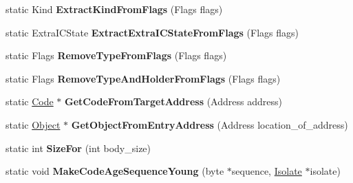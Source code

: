 \begin{DoxyCompactItemize}
\item 
\hypertarget{classv8_1_1internal_1_1_code_aa0ad62b9d5593fe9ae36d9952cfe812a}{}static Kind {\bfseries Extract\+Kind\+From\+Flags} (Flags flags)\label{classv8_1_1internal_1_1_code_aa0ad62b9d5593fe9ae36d9952cfe812a}

\item 
\hypertarget{classv8_1_1internal_1_1_code_aee2182492672bc97ccb8b64061ca346f}{}static Extra\+I\+C\+State {\bfseries Extract\+Extra\+I\+C\+State\+From\+Flags} (Flags flags)\label{classv8_1_1internal_1_1_code_aee2182492672bc97ccb8b64061ca346f}

\item 
\hypertarget{classv8_1_1internal_1_1_code_aea1c114e4e68b161376e82009f7a6f61}{}static Flags {\bfseries Remove\+Type\+From\+Flags} (Flags flags)\label{classv8_1_1internal_1_1_code_aea1c114e4e68b161376e82009f7a6f61}

\item 
\hypertarget{classv8_1_1internal_1_1_code_a798b8020d679b41b4e5b62ab5960f87d}{}static Flags {\bfseries Remove\+Type\+And\+Holder\+From\+Flags} (Flags flags)\label{classv8_1_1internal_1_1_code_a798b8020d679b41b4e5b62ab5960f87d}

\item 
\hypertarget{classv8_1_1internal_1_1_code_a2f9d00c94ce780d060b933318a78e118}{}static \hyperlink{classv8_1_1internal_1_1_code}{Code} $\ast$ {\bfseries Get\+Code\+From\+Target\+Address} (Address address)\label{classv8_1_1internal_1_1_code_a2f9d00c94ce780d060b933318a78e118}

\item 
\hypertarget{classv8_1_1internal_1_1_code_ab848ed45a70efa2b3c2e3a30050f22d9}{}static \hyperlink{classv8_1_1internal_1_1_object}{Object} $\ast$ {\bfseries Get\+Object\+From\+Entry\+Address} (Address location\+\_\+of\+\_\+address)\label{classv8_1_1internal_1_1_code_ab848ed45a70efa2b3c2e3a30050f22d9}

\item 
\hypertarget{classv8_1_1internal_1_1_code_acad887ee43af2a9777cd0569940d54e1}{}static int {\bfseries Size\+For} (int body\+\_\+size)\label{classv8_1_1internal_1_1_code_acad887ee43af2a9777cd0569940d54e1}

\item 
\hypertarget{classv8_1_1internal_1_1_code_a819cb6b55450a6d6f995736672ced5ed}{}static void {\bfseries Make\+Code\+Age\+Sequence\+Young} (byte $\ast$sequence, \hyperlink{classv8_1_1internal_1_1_isolate}{Isolate} $\ast$isolate)\label{classv8_1_1internal_1_1_code_a819cb6b55450a6d6f995736672ced5ed}


\end{DoxyCompactItemize}
